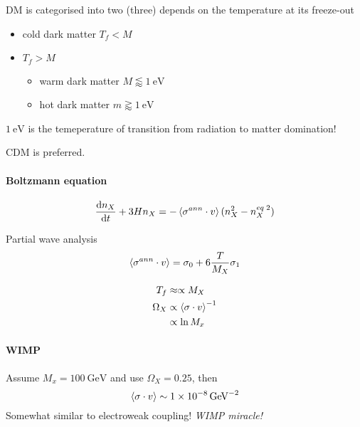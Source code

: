 \documentclass[12pt, a4paper, DIV=15]{article}
\numberwithin{equation}{section}
\begin{document}
DM is categorised into two (three) depends on the temperature at its freeze-out
\begin{itemize}
   \item cold dark matter $T_f < M$
   \item $T_f > M$
      \begin{itemize}
         \item warm dark matter $M \lessapprox \SI{1}{\eV}$
         \item hot dark matter $m \gtrapprox \SI{1}{\eV}$
      \end{itemize}
\end{itemize}
$\SI{1}{\eV}$ is the temeperature of transition from radiation to matter domination!

CDM is preferred.

\paragraph{Boltzmann equation}
\begin{equation}
   \dv{n_X}{t} + 3 Hn_X = - \expval{\sigma^{ann}\cdot v} (n_X^2 - n^{eq\; 2}_X)
\end{equation}

Partial wave analysis
\begin{equation}
   \expval{\sigma^{ann}\cdot v} = \sigma_0 + 6 \frac{T}{M_X} \sigma_1
\end{equation}

\begin{align}
   T_f &\approx \propto M_X \\
   \Omega_X &\propto \expval{\sigma \cdot v}^{-1} \\
       &\propto \ln M_x
\end{align}

\paragraph{WIMP}
Assume $M_x = \SI{100}{\giga \eV}$ and use $\Omega_X = 0.25$, then
\begin{equation}
   \expval{\sigma \cdot v} \sim \SI{1e-8}{\giga\eV\tothe{-2}}
\end{equation}
Somewhat similar to electroweak coupling! \textit{WIMP miracle!}
\end{document}
